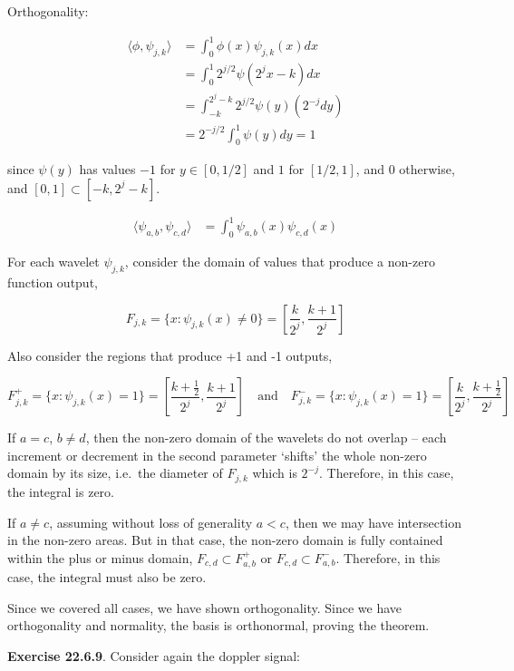 Orthogonality:

\[
\begin{align}
\langle \phi, \psi_{j, k} \rangle &= \int_0^1 \phi(x) \psi_{j, k}(x) dx \\
&= \int_0^1  2^{j / 2} \psi(2^j x - k) dx  \\
&= \int_{-k}^{2^j - k} 2^{j / 2}  \psi(y) \left( 2^{-j} dy \right) \\
&= 2^{-j/2} \int_0^1 \psi(y) dy = 1
\end{align}
\]

since \(\psi(y)\) has values \(-1\) for \(y \in [0, 1/2]\) and \(1\) for
\([1/2, 1]\), and 0 otherwise, and \([0, 1] \subset [-k, 2^j - k]\).

\[
\begin{align}
\langle \psi_{a, b}, \psi_{c, d} \rangle &= \int_0^1 \psi_{a, b}(x) \psi_{c, d}(x)
\end{align}
\]

For each wavelet \(\psi_{j, k}\), consider the domain of values that
produce a non-zero function output,

\[F_{j, k} = \{ x : \psi_{j, k}(x) \neq 0 \} = \left[\frac{k}{2^j}, \frac{k + 1}{2^j} \right]\]

Also consider the regions that produce +1 and -1 outputs,

\[F_{j, k}^+ = \{ x : \psi_{j, k}(x) = 1 \} = \left[\frac{k + \frac{1}{2}}{2^j}, \frac{k + 1}{2^j} \right]
\quad \text{and} \quad
F_{j, k}^- = \{ x : \psi_{j, k}(x) = 1 \} = \left[\frac{k}{2^j}, \frac{k + \frac{1}{2}}{2^j} \right]\]

If \(a = c\), \(b \neq d\), then the non-zero domain of the wavelets do
not overlap -- each increment or decrement in the second parameter
`shifts' the whole non-zero domain by its size, i.e.~the diameter of
\(F_{j, k}\) which is \(2^{-j}\). Therefore, in this case, the integral
is zero.

If \(a \neq c\), assuming without loss of generality \(a < c\), then we
may have intersection in the non-zero areas. But in that case, the
non-zero domain is fully contained within the plus or minus domain,
\(F_{c, d} \subset F_{a, b}^+\) or \(F_{c, d} \subset F_{a, b}^-\).
Therefore, in this case, the integral must also be zero.

Since we covered all cases, we have shown orthogonality. Since we have
orthogonality and normality, the basis is orthonormal, proving the
theorem.

\textbf{Exercise 22.6.9}. Consider again the doppler signal:

